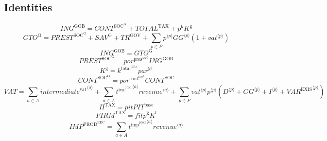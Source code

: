\subsection{Identities}

\begin{equation}
{I\!N\!G}^{\mathrm{GOB}} = {C\!O\!N\!T}^{\mathrm{SOC}^{\mathrm{G}}} + {T\!O\!T\!A\!L}^{\mathrm{TAX}} + {p^{\mathrm{k}}} {K^{\mathrm{g}}}
\end{equation}
\begin{equation}
{G\!T\!O}^{\mathrm{G}} = {P\!R\!E\!S\!T}^{\mathrm{SOC}^{\mathrm{G}}} + {S\!A\!V}^{\mathrm{G}} + {T\!R}^{\mathrm{GOV}} + \sum_{p\in P} {{p}^{\langle p\rangle}} {{{G\!G}}^{\langle p\rangle}} \left(1 + {{v\!a\!t}}^{\langle p\rangle}\right)
\end{equation}
\begin{equation}
{I\!N\!G}^{\mathrm{GOB}} = {G\!T\!O}^{\mathrm{G}}
\end{equation}
\begin{equation}
{P\!R\!E\!S\!T}^{\mathrm{SOC}^{\mathrm{G}}} = {{p\!o\!r}^{\mathrm{pres}^{\mathrm{soc}^{\mathrm{g}}}}} {{I\!N\!G}^{\mathrm{GOB}}}
\end{equation}
\begin{equation}
K^{\mathrm{g}} = {k^{\mathrm{total}^{\mathrm{data}}}} {{p\!a\!r}^{\mathrm{k}^{\mathrm{g}}}}
\end{equation}
\begin{equation}
{C\!O\!N\!T}^{\mathrm{SOC}^{\mathrm{G}}} = {{p\!o\!r}^{\mathrm{cont}^{\mathrm{soc}^{\mathrm{g}}}}} {{C\!O\!N\!T}^{\mathrm{SOC}}}
\end{equation}
\begin{equation}
{V\!A\!T} = \sum_{a\in A} {{i\!n\!t\!e\!r\!m\!e\!d\!i\!a\!t\!e}^{\mathrm{vat}}}^{\langle a\rangle} + \sum_{a\in A} {{t^{\mathrm{iva}^{\mathrm{prod}}}}^{\langle a\rangle}} {{{r\!e\!v\!e\!n\!u\!e}}^{\langle a\rangle}} + \sum_{p\in P} {{{v\!a\!t}}^{\langle p\rangle}} {{p}^{\langle p\rangle}} \left({D}^{\langle p\rangle} + {{G\!G}}^{\langle p\rangle} + {I}^{\langle p\rangle} + {{V\!A\!R}^{\mathrm{EXIS}}}^{\langle p\rangle}\right)
\end{equation}
\begin{equation}
\Pi^{\mathrm{TAX}} = {{p\!i\!t}} {{P\!I\!T}^{\mathrm{base}}}
\end{equation}
\begin{equation}
{F\!I\!R\!M}^{\mathrm{TAX}} = {{f\!i\!t}} {p^{\mathrm{k}}} {K^{\mathrm{f}}}
\end{equation}
\begin{equation}
{I\!M\!P}^{\mathrm{PROD}^{\mathrm{REC}}} = \sum_{a\in A} {{t^{\mathrm{imp}^{\mathrm{prod}}}}^{\langle a\rangle}} {{{r\!e\!v\!e\!n\!u\!e}}^{\langle a\rangle}}
\end{equation}

